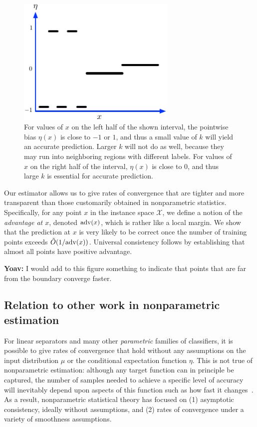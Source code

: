 \documentclass{article}
\def\X{{\mathcal X}}
\def\adv{{\rm adv}}
\begin{document}
\begin{figure}
\begin{center}
\includegraphics[width=3in]{adaptive-rationale.pdf}
\end{center}
\caption{For values of $x$ on the left half of the shown interval, the
  pointwise bias $\eta(x)$ is close to $-1$ or $1$, and thus a small value of $k$ will yield an accurate prediction. Larger $k$ will not do as well, because they may run into neighboring regions with different labels. For values of $x$ on the right half of the interval, $\eta(x)$ is close to $0$, and thus large $k$ is essential for accurate prediction.}
\label{fig:rationale}
\end{figure}

Our estimator allows us to give rates of convergence that are tighter and more 
transparent than those customarily obtained in nonparametric statistics. Specifically, for any point $x$ in the instance space $\X$, we define a notion of the {\it advantage at $x$}, denoted $\adv(x)$, which is rather like a local margin. We show that the prediction at $x$ is very likely to be correct once the number of training points exceeds $\tilde{O}(1/\adv(x))$. Universal consistency follows by establishing that almost all points have positive advantage.

{\bf Yoav:} I would add to this figure something to indicate that
points that are far from the boundary converge faster.
  
\subsection{Relation to other work in nonparametric estimation}

For linear separators and many other {\it parametric} families of classifiers, it is possible to give rates of convergence that hold without any assumptions on the input distribution $\mu$ or the conditional expectation function $\eta$. This is not true of nonparametric estimation: although any target function can in principle be captured, the number of samples needed to achieve a specific level of accuracy will inevitably depend upon aspects of this function such as how fast it changes~\cite[chapter 7]{DGL96}. As a result, nonparametric statistical theory has focused on (1) asymptotic consistency, ideally without assumptions, and (2) rates of convergence under a variety of smoothness assumptions.
\end{document}
